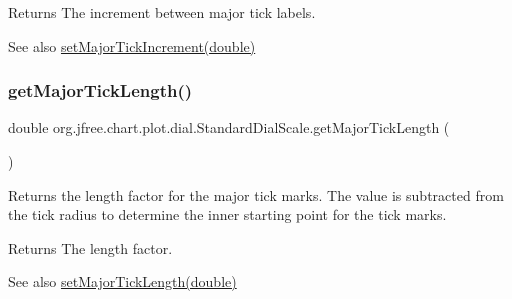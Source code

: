 \begin{DoxyReturn}{Returns}
The increment between major tick labels.
\end{DoxyReturn}
\begin{DoxySeeAlso}{See also}
\mbox{\hyperlink{classorg_1_1jfree_1_1chart_1_1plot_1_1dial_1_1_standard_dial_scale_afeabd8e29cd300186e06ad2a7683e7b1}{set\+Major\+Tick\+Increment(double)}} 
\end{DoxySeeAlso}
\mbox{\label{classorg_1_1jfree_1_1chart_1_1plot_1_1dial_1_1_standard_dial_scale_a075e82dfa28d221b97a512fb10469e64}} 
\subsubsection{\texorpdfstring{get\+Major\+Tick\+Length()}{getMajorTickLength()}}
{\footnotesize\ttfamily double org.\+jfree.\+chart.\+plot.\+dial.\+Standard\+Dial\+Scale.\+get\+Major\+Tick\+Length (\begin{DoxyParamCaption}{ }\end{DoxyParamCaption})}

Returns the length factor for the major tick marks. The value is subtracted from the tick radius to determine the inner starting point for the tick marks.

\begin{DoxyReturn}{Returns}
The length factor.
\end{DoxyReturn}
\begin{DoxySeeAlso}{See also}
\mbox{\hyperlink{classorg_1_1jfree_1_1chart_1_1plot_1_1dial_1_1_standard_dial_scale_a3531e89f783571d0c9c07911e88aea6e}{set\+Major\+Tick\+Length(double)}} 
\end{DoxySeeAlso}
\mbox{\label{classorg_1_1jfree_1_1chart_1_1plot_1_1dial_1_1_standard_dial_scale_a0c8dca20d8b757432a694aae2ae75267}} 
